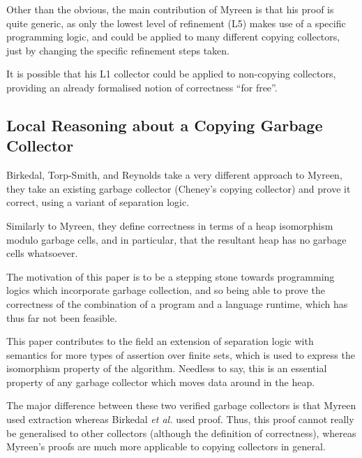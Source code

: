 Other than the obvious, the main contribution of Myreen is that his
proof is quite generic, as only the lowest level of refinement (L5)
makes use of a specific programming logic, and could be applied to many
different copying collectors, just by changing the specific refinement
steps taken.

It is possible that his L1 collector could be applied to non-copying
collectors, providing an already formalised notion of correctness
``for free''.

\subsection{Local Reasoning about a Copying Garbage Collector}

Birkedal, Torp-Smith, and Reynolds\cite{Birkedal04} take a very
different approach to Myreen, they take an existing \gls{garbage
  collector} (Cheney's copying collector) and prove it correct, using
a variant of separation logic.

Similarly to Myreen, they define correctness in terms of a heap
isomorphism modulo garbage cells, and in particular, that the
resultant heap has no garbage cells whatsoever.

The motivation of this paper is to be a stepping stone towards
programming logics which incorporate \gls{garbage collection}, and so
being able to prove the correctness of the combination of a program
and a language runtime, which has thus far not been feasible.

This paper contributes to the field an extension of separation logic
with semantics for more types of assertion over finite sets, which is
used to express the isomorphism property of the algorithm. Needless to
say, this is an essential property of any garbage collector which
moves data around in the heap.

The major difference between these two verified garbage collectors is
that Myreen used extraction whereas Birkedal \textit{et al.} used
proof. Thus, this proof cannot really be generalised to other
collectors (although the definition of correctness), whereas Myreen's
proofs are much more applicable to copying collectors in general.
